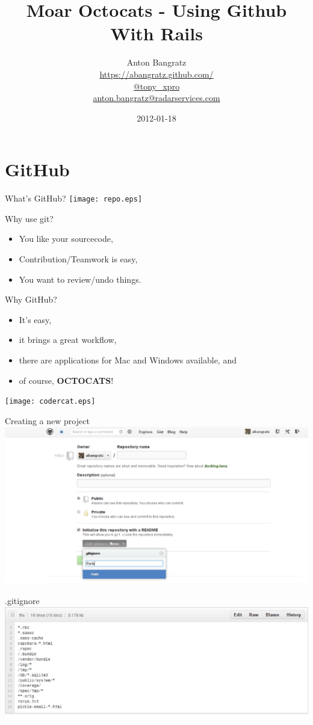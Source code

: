 \documentclass[style=husky,display=slides,clock]{powerdot}
\title{Moar Octocats - Using Github With Rails}
\author{Anton Bangratz\\
	\url{https://abangratz.github.com/}\\
	\url{@tony_xpro}\\
\url{anton.bangratz@radarservices.com}}
\date{2012-01-18}
\begin{document}
\maketitle
\section{GitHub}
\begin{slide}{What's GitHub?}
	\texttt{[image: repo.eps]}
\end{slide}
\begin{slide}{Why use git?}
	\pause
	\begin{itemize}
		\item You like your sourcecode,\pause
		\item Contribution/Teamwork is easy\pause,
		\item You want to review/undo things.
	\end{itemize}
\end{slide}
\begin{slide}{Why GitHub?}
	\pause
	\begin{itemize}
		\item It's easy,\pause
		\item it brings a great workflow,\pause
		\item there are applications for Mac and Windows available, and \pause
		\item of course, \textbf{OCTOCATS}!
	\end{itemize}
	\texttt{[image: codercat.eps]}
\end{slide}
\begin{slide}{Creating a new project}
	\includegraphics[scale=0.35]{rails_github_new.eps}
\end{slide}
\begin{slide}{.gitignore}
	\includegraphics[scale=0.35]{rails_gitignore.eps}
\end{slide}
\end{document}
